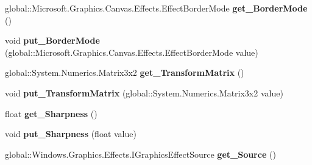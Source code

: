 \begin{DoxyCompactItemize}
global\+::\+Microsoft.\+Graphics.\+Canvas.\+Effects.\+Effect\+Border\+Mode {\bfseries get\+\_\+\+Border\+Mode} ()
\item 
\mbox{\label{class_microsoft_1_1_graphics_1_1_canvas_1_1_effects_1_1_transform2_d_effect_a3c44e6817302d293e5cd76726375a5e1}} 
void {\bfseries put\+\_\+\+Border\+Mode} (global\+::\+Microsoft.\+Graphics.\+Canvas.\+Effects.\+Effect\+Border\+Mode value)
\item 
\mbox{\label{class_microsoft_1_1_graphics_1_1_canvas_1_1_effects_1_1_transform2_d_effect_ac3153a849025ced8b89361d97104772b}} 
global\+::\+System.\+Numerics.\+Matrix3x2 {\bfseries get\+\_\+\+Transform\+Matrix} ()
\item 
\mbox{\label{class_microsoft_1_1_graphics_1_1_canvas_1_1_effects_1_1_transform2_d_effect_ab2dc992da27919ab922f3015532abe68}} 
void {\bfseries put\+\_\+\+Transform\+Matrix} (global\+::\+System.\+Numerics.\+Matrix3x2 value)
\item 
\mbox{\label{class_microsoft_1_1_graphics_1_1_canvas_1_1_effects_1_1_transform2_d_effect_aa820a4ea7ef6fe6bb2d75e16c55e2d44}} 
float {\bfseries get\+\_\+\+Sharpness} ()
\item 
\mbox{\label{class_microsoft_1_1_graphics_1_1_canvas_1_1_effects_1_1_transform2_d_effect_af157b24374215992f857b4060fe2ed79}} 
void {\bfseries put\+\_\+\+Sharpness} (float value)
\item 
\mbox{\label{class_microsoft_1_1_graphics_1_1_canvas_1_1_effects_1_1_transform2_d_effect_af35c6e93668e25c4c57cbcbce7286516}} 
global\+::\+Windows.\+Graphics.\+Effects.\+I\+Graphics\+Effect\+Source {\bfseries get\+\_\+\+Source} ()
\item 
\mbox{\label{class_microsoft_1_1_graphics_1_1_canvas_1_1_effects_1_1_transform2_d_effect_a89344f36eb3d3c2b19dbe91b8d618d90}} 

\end{DoxyCompactItemize}
